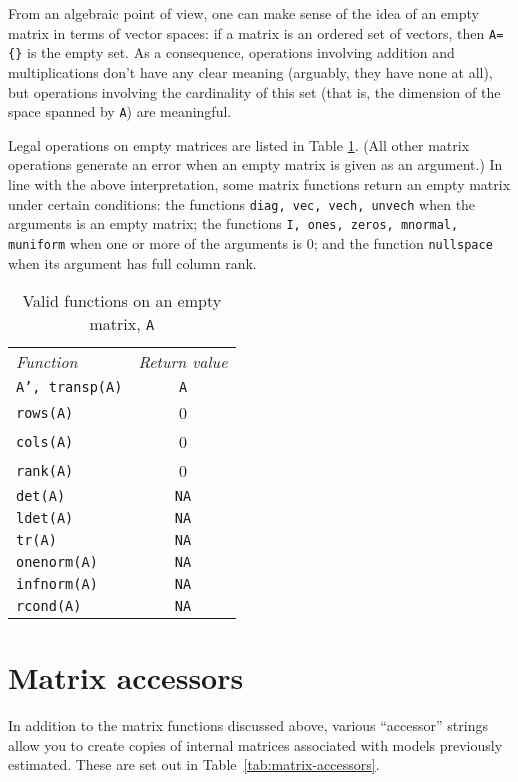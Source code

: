 From an algebraic point of view, one can make sense of the idea of an
empty matrix in terms of vector spaces: if a matrix is an ordered set
of vectors, then \verb|A={}| is the empty set.  As a consequence,
operations involving addition and multiplications don't have any clear
meaning (arguably, they have none at all), but operations involving
the cardinality of this set (that is, the dimension of the space
spanned by \texttt{A}) are meaningful.

Legal operations on empty matrices are listed in Table
\ref{tab:empty-matrix-funcs}.  (All other matrix operations generate
an error when an empty matrix is given as an argument.)  In line with
the above interpretation, some matrix functions return an empty matrix
under certain conditions: the functions \texttt{diag, vec, vech,
  unvech} when the arguments is an empty matrix; the functions
\texttt{I, ones, zeros, mnormal, muniform} when one or more of the
arguments is 0; and the function \texttt{nullspace} when its argument
has full column rank.

\begin{table}[htbp]
\centering
\begin{tabular}{lc}
\textit{Function} & \textit{Return value} \\ [4pt]
  \texttt{A', transp(A)} & \texttt{A} \\
  \texttt{rows(A)} & 0 \\
  \texttt{cols(A)} & 0 \\
  \texttt{rank(A)} & 0 \\
  \texttt{det(A)} & \texttt{NA} \\
  \texttt{ldet(A)} & \texttt{NA} \\
  \texttt{tr(A)} & \texttt{NA} \\
  \texttt{onenorm(A)} & \texttt{NA} \\
  \texttt{infnorm(A)} & \texttt{NA} \\
  \texttt{rcond(A)} & \texttt{NA} \\
\end{tabular}
\caption{Valid functions on an empty matrix, \texttt{A}}
\label{tab:empty-matrix-funcs}
\end{table}


\section{Matrix accessors}
\label{matrix-accessors}

In addition to the matrix functions discussed above,
various ``accessor'' strings allow you to create copies of internal
matrices associated with models previously estimated.
These are set out in Table~\ref{tab:matrix-accessors}.

